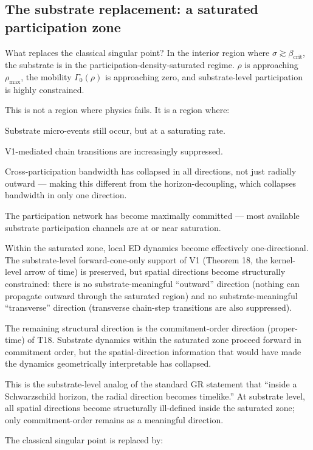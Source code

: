 \documentclass[11pt,a4paper]{article}
\begin{document}
\subsection{The substrate replacement: a saturated participation zone}

What replaces the classical singular point? In the interior region where $\sigma \gtrsim \beta_{\mathrm{crit}}$, the substrate is in the participation-density-saturated regime. $\rho$ is approaching $\rho_{\mathrm{max}}$, the mobility $\Gamma_0(\rho)$ is approaching zero, and substrate-level participation is highly constrained.

This is not a region where physics fails. It is a region where:

Substrate micro-events still occur, but at a saturating rate.

V1-mediated chain transitions are increasingly suppressed.

Cross-participation bandwidth has collapsed in all directions, not just radially outward --- making this different from the horizon-decoupling, which collapses bandwidth in only one direction.

The participation network has become maximally committed --- most available substrate participation channels are at or near saturation.

Within the saturated zone, local ED dynamics become effectively one-directional. The substrate-level forward-cone-only support of V1 (Theorem 18, the kernel-level arrow of time) is preserved, but spatial directions become structurally constrained: there is no substrate-meaningful ``outward'' direction (nothing can propagate outward through the saturated region) and no substrate-meaningful ``transverse'' direction (transverse chain-step transitions are also suppressed).

The remaining structural direction is the commitment-order direction (proper-time) of T18. Substrate dynamics within the saturated zone proceed forward in commitment order, but the spatial-direction information that would have made the dynamics geometrically interpretable has collapsed.

This is the substrate-level analog of the standard GR statement that ``inside a Schwarzschild horizon, the radial direction becomes timelike.'' At substrate level, all spatial directions become structurally ill-defined inside the saturated zone; only commitment-order remains as a meaningful direction.

The classical singular point is replaced by:
\end{document}
